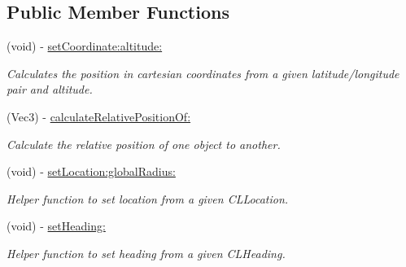 \subsection*{Public Member Functions}
\begin{DoxyCompactItemize}
\item 
\hypertarget{interface_a_r_world_location_a602a1aa29f7aa4403091ffae9eaa76ba}{
(void) -\/ \hyperlink{interface_a_r_world_location_a602a1aa29f7aa4403091ffae9eaa76ba}{setCoordinate:altitude:}}
\label{interface_a_r_world_location_a602a1aa29f7aa4403091ffae9eaa76ba}

\begin{DoxyCompactList}\small\item\em Calculates the position in cartesian coordinates from a given latitude/longitude pair and altitude. \end{DoxyCompactList}\item 
(Vec3) -\/ \hyperlink{interface_a_r_world_location_a3e62f3cc4265c32e4044aa0ac161679a}{calculateRelativePositionOf:}
\begin{DoxyCompactList}\small\item\em Calculate the relative position of one object to another. \end{DoxyCompactList}\item 
\hypertarget{interface_a_r_world_location_a16a712dce023f2813ac41696ec5fc441}{
(void) -\/ \hyperlink{interface_a_r_world_location_a16a712dce023f2813ac41696ec5fc441}{setLocation:globalRadius:}}
\label{interface_a_r_world_location_a16a712dce023f2813ac41696ec5fc441}

\begin{DoxyCompactList}\small\item\em Helper function to set location from a given CLLocation. \end{DoxyCompactList}\item 
\hypertarget{interface_a_r_world_location_a622c231529aa0d3ff78e4650c32c4b0a}{
(void) -\/ \hyperlink{interface_a_r_world_location_a622c231529aa0d3ff78e4650c32c4b0a}{setHeading:}}
\label{interface_a_r_world_location_a622c231529aa0d3ff78e4650c32c4b0a}

\begin{DoxyCompactList}\small\item\em Helper function to set heading from a given CLHeading. \end{DoxyCompactList}\end{DoxyCompactItemize}
